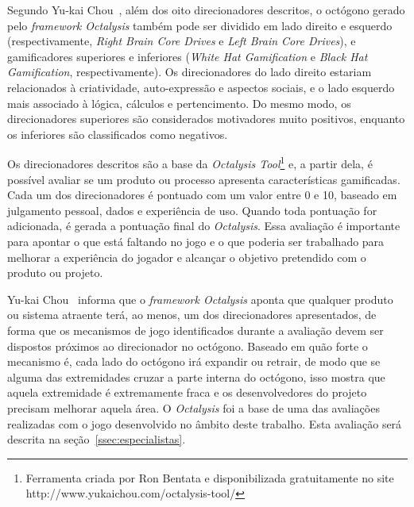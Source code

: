 Segundo Yu-kai Chou~\cite{chou_octalysis_2015}, além dos oito direcionadores descritos, o octógono gerado pelo \textit{framework Octalysis} também pode ser dividido em lado direito e esquerdo (respectivamente, \textit{Right Brain Core Drives} e \textit{Left Brain Core Drives}), e gamificadores superiores e inferiores (\textit{White Hat Gamification} e \textit{Black Hat Gamification}, respectivamente).  Os direcionadores do lado direito estariam relacionados à criatividade, auto-expressão e aspectos sociais, e o lado esquerdo mais associado à lógica, cálculos e pertencimento. Do mesmo modo, os direcionadores superiores são considerados motivadores muito positivos, enquanto os inferiores são classificados como negativos.

Os direcionadores descritos são a base da \textit{Octalysis Tool}\footnote{Ferramenta criada por Ron Bentata e disponibilizada gratuitamente no site http://www.yukaichou.com/octalysis-tool/} e, a partir dela, é possível avaliar se um produto ou processo apresenta características gamificadas. Cada um dos direcionadores é pontuado com um valor entre 0 e 10, baseado em julgamento pessoal, dados e experiência de uso. Quando toda pontuação for adicionada, é gerada a pontuação final do \textit{Octalysis}. Essa avaliação é importante para apontar o que está faltando no jogo e o que poderia ser trabalhado para melhorar a experiência do jogador e alcançar o objetivo pretendido com o produto ou projeto.

Yu-kai Chou~\cite{chou_octalysis_2015} informa que o \textit{framework Octalysis} aponta que qualquer produto ou sistema atraente terá, ao menos, um dos direcionadores apresentados, de forma que os mecanismos de jogo identificados durante a avaliação devem ser dispostos próximos ao direcionador no octógono. Baseado em quão forte o mecanismo é, cada lado do octógono irá expandir ou retrair, de modo que se alguma das extremidades cruzar a parte interna do octógono, isso mostra que aquela extremidade é extremamente fraca e os desenvolvedores do projeto precisam melhorar aquela área. O \textit{Octalysis} foi a base de uma das avaliações realizadas com o jogo desenvolvido no âmbito deste trabalho. Esta avaliação será descrita na seção~\ref{ssec:especialistas}.


